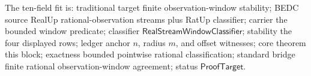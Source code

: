 The ten-field fit is: traditional target finite observation-window stability;
BEDC source RealUp rational-observation streams plus RatUp classifier; carrier
the bounded window predicate; classifier
$\mathsf{RealStreamWindowClassifier}$; stability the four displayed rows;
ledger anchor $n$, radius $m$, and offset witnesses; core theorem this block;
exactness bounded pointwise rational classification; standard bridge finite
rational observation-window agreement; status $\mathsf{ProofTarget}$.
